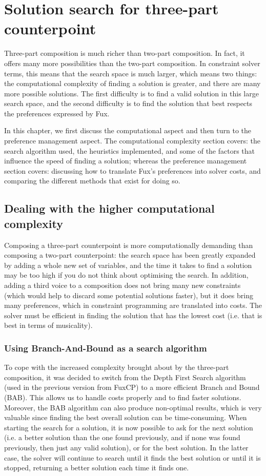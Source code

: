\chapter{Solution search for three-part counterpoint}\label{chapter:search}
Three-part composition is much richer than two-part composition. In fact, it offers many more possibilities than the two-part composition. In constraint solver terms, this means that the search space is much larger, which means two things: the computational complexity of finding a solution is greater, and there are many more possible solutions. The first difficulty is to find a valid solution in this large search space, and the second difficulty is to find the solution that best respects the preferences expressed by Fux.

In this chapter, we first discuss the computational aspect and then turn to the preference management aspect.
The computational complexity section covers: the search algorithm used, the heuristics implemented, and some of the factors that influence the speed of finding a solution; whereas the preference management section covers: discussing how to translate Fux's preferences into solver costs, and comparing the different methods that exist for doing so. 

\section{Dealing with the higher computational complexity}
Composing a three-part counterpoint is more computationally demanding than composing a two-part counterpoint: the search space has been greatly expanded by adding a whole new set of variables, and the time it takes to find a solution may be too high if you do not think about optimising the search. In addition, adding a third voice to a composition does not bring many new constraints (which would help to discard some potential solutions faster), but it does bring many preferences, which in constraint programming are translated into costs. The solver must be efficient in finding the solution that has the lowest cost (i.e. that is best in terms of musicality).

\subsection{Using Branch-And-Bound as a search algorithm}

To cope with the increased complexity brought about by the three-part composition, it was decided to switch from the Depth First Search algorithm (used in the previous version from FuxCP) to a more efficient Branch and Bound (BAB). This allows us to handle costs properly and to find faster solutions. Moreover, the BAB algorithm can also produce non-optimal results, which is very valuable since finding the best overall solution can be time-consuming. When starting the search for a solution, it is now possible to ask for the next solution (i.e. a better solution than the one found previously, and if none was found previously, then just any valid solution), or for the best solution. In the latter case, the solver will continue to search until it finds the best solution or until it is stopped, returning a better solution each time it finds one.



